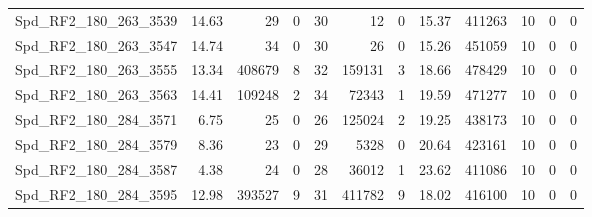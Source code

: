 \begin{longtable}[c]{@{}lrrrrrrrrrrr@{}}
Spd\_RF2\_180\_263\_3539      & 14.63                  & 29                      & 0                       & 30                     & 12                      & 0                       & 15.37                   & 411263                   & 10                       & 0                        & 0                        \\
Spd\_RF2\_180\_263\_3547      & 14.74                  & 34                      & 0                       & 30                     & 26                      & 0                       & 15.26                   & 451059                   & 10                       & 0                        & 0                        \\
Spd\_RF2\_180\_263\_3555      & 13.34                  & 408679                  & 8                       & 32                     & 159131                  & 3                       & 18.66                   & 478429                   & 10                       & 0                        & 0                        \\
Spd\_RF2\_180\_263\_3563      & 14.41                  & 109248                  & 2                       & 34                     & 72343                   & 1                       & 19.59                   & 471277                   & 10                       & 0                        & 0                        \\
Spd\_RF2\_180\_284\_3571      & 6.75                   & 25                      & 0                       & 26                     & 125024                  & 2                       & 19.25                   & 438173                   & 10                       & 0                        & 0                        \\
Spd\_RF2\_180\_284\_3579      & 8.36                   & 23                      & 0                       & 29                     & 5328                    & 0                       & 20.64                   & 423161                   & 10                       & 0                        & 0                        \\
Spd\_RF2\_180\_284\_3587      & 4.38                   & 24                      & 0                       & 28                     & 36012                   & 1                       & 23.62                   & 411086                   & 10                       & 0                        & 0                        \\
Spd\_RF2\_180\_284\_3595      & 12.98                  & 393527                  & 9                       & 31                     & 411782                  & 9                       & 18.02                   & 416100                   & 10                       & 0                        & 0                        \\

\end{longtable}
